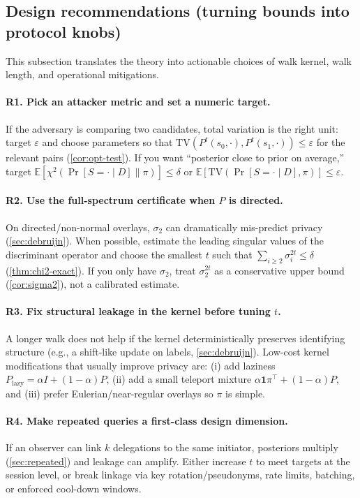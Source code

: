 \documentclass[11pt]{article}
\newcommand{\TV}{\mathrm{TV}}
\newcommand{\E}{\mathbb{E}}
\begin{document}
\subsection*{Design recommendations (turning bounds into protocol knobs)}
This subsection translates the theory into actionable choices of walk kernel,
walk length, and operational mitigations.

\paragraph{R1. Pick an attacker metric and set a numeric target.}
If the adversary is comparing two candidates, total variation is the right unit:
target $\varepsilon$ and choose parameters so that
$\TV(P^t(s_0,\cdot),P^t(s_1,\cdot))\le \varepsilon$ for the relevant pairs
(\cref{cor:opt-test}). If you want ``posterior close to prior on average,''
target $\E[\chi^2(\Pr[S=\cdot\mid D]\|\pi)]\le \delta$ or
$\E[\TV(\Pr[S=\cdot\mid D],\pi)]\le \varepsilon$.

\paragraph{R2. Use the full-spectrum certificate when $P$ is directed.}
On directed/non-normal overlays, $\sigma_2$ can dramatically mis-predict privacy
(\cref{sec:debruijn}). When possible, estimate the leading singular values of the
discriminant operator and choose the smallest $t$ such that
$\sum_{i\ge 2}\sigma_i^{2t}\le \delta$ (\cref{thm:chi2-exact}). If you only have
$\sigma_2$, treat $\sigma_2^{2t}$ as a conservative upper bound (\cref{cor:sigma2}),
not a calibrated estimate.

\paragraph{R3. Fix structural leakage in the kernel before tuning $t$.}
A longer walk does not help if the kernel deterministically preserves identifying
structure (e.g., a shift-like update on labels, \cref{sec:debruijn}). Low-cost
kernel modifications that usually improve privacy are:
(i) add laziness $P_{\text{lazy}}=\alpha I+(1-\alpha)P$,
(ii) add a small teleport mixture $\alpha \mathbf{1}\pi^\top+(1-\alpha)P$,
and (iii) prefer Eulerian/near-regular overlays so $\pi$ is simple.

\paragraph{R4. Make repeated queries a first-class design dimension.}
If an observer can link $k$ delegations to the same initiator, posteriors
multiply (\cref{sec:repeated}) and leakage can amplify. Either increase $t$ to
meet targets at the session level, or break linkage via key rotation/pseudonyms,
rate limits, batching, or enforced cool-down windows.
\end{document}
